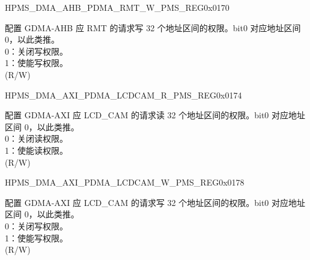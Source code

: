 \begin{register}{H}{PMS\_DMA\_AHB\_PDMA\_RMT\_W\_PMS\_REG}{0x0170}\label{regdesc:PMSDMAAHBPDMARMTWPMSREG}
%
\regnewline%
\begin{regdesc}\begin{reglist}
\label{fielddesc:PMSDMAAHBPDMARMTWPMS}\item [PMS\_DMA\_AHB\_PDMA\_RMT\_W\_PMS] 配置 GDMA-AHB 应 RMT 的请求写 32 个地址区间的权限。bit0 对应地址区间 0，以此类推。\\
0：关闭写权限。\\
1：使能写权限。\\ (R/W)
\end{reglist}\end{regdesc}
\end{register}


\begin{register}{H}{PMS\_DMA\_AXI\_PDMA\_LCDCAM\_R\_PMS\_REG}{0x0174}\label{regdesc:PMSDMAAXIPDMALCDCAMRPMSREG}
%
\regnewline%
\begin{regdesc}\begin{reglist}
\label{fielddesc:PMSDMAAXIPDMALCDCAMRPMS}\item [PMS\_DMA\_AXI\_PDMA\_LCDCAM\_R\_PMS] 配置 GDMA-AXI 应 LCD\_CAM 的请求读 32 个地址区间的权限。bit0 对应地址区间 0，以此类推。\\
0：关闭读权限。\\
1：使能读权限。\\ (R/W)
\end{reglist}\end{regdesc}
\end{register}


\begin{register}{H}{PMS\_DMA\_AXI\_PDMA\_LCDCAM\_W\_PMS\_REG}{0x0178}\label{regdesc:PMSDMAAXIPDMALCDCAMWPMSREG}
%
\regnewline%
\begin{regdesc}\begin{reglist}
\label{fielddesc:PMSDMAAXIPDMALCDCAMWPMS}\item [PMS\_DMA\_AXI\_PDMA\_LCDCAM\_W\_PMS] 配置 GDMA-AXI 应 LCD\_CAM 的请求写 32 个地址区间的权限。bit0 对应地址区间 0，以此类推。\\
0：关闭写权限。\\
1：使能写权限。\\ (R/W)
\end{reglist}\end{regdesc}
\end{register}


